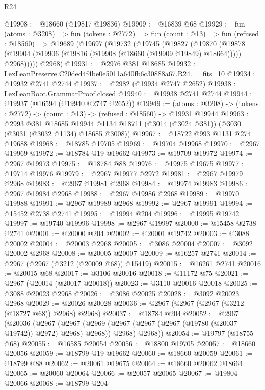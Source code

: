 \begin{lexlean}{R24}
\begin{coremodule}
@19908 := @18660 (@19817 @19836)
@19909 := @16839 @68
@19929 := fun (atoms : @3208) =>
  fun (tokens : @2772) =>
  fun (count : @13) =>
  fun (refused : @18560) =>
  @19689
    (@19697
      (@19732
        (@19745
          (@19827
            (@19870
              (@19878 (@19904 (@19906 (@19816 (@19908 (@18660 (@19909 @19849) @18664))))) @2968)))))
      @2968)
@19931 := @2976 @381 @18685
@19932 := LexLeanPreserve.C20ded4f4be0e5011a640fb6c30888a67.R24.__fits_10
@19934 := @19932 @2741 @2744
@19937 := @2982 (@19934 @2747 @2652)
@19938 := LexLeanBoot.GrammarProof.closed
@19940 := @19938 @2741 @2744
@19944 := @19937 (@16594 (@19940 @2747 @2652))
@19949 := (atoms : @3208) ->
  (tokens : @2772) -> (count : @13) -> (refused : @18560) -> @19931 @19944
@19963 := @2993
    @381
    @18685
    @19944
    @1134
    @18711
    (@3014 (@3024 @381))
    (@3030 (@3031 (@3032 @1134) @18685 @3008))
@19967 := @18722 @993 @1131 @274 @19688
@19968 := @18785 @19705
@19969 := @19704 @19968
@19970 := @2967 @19969
@19972 := @18784 @19 @19662
@19973 := @19709 @19972
@19974 := @2967 @19973
@19975 := @18784 @88
@19976 := @19975 @19675
@19977 := @19714 @19976
@19979 := @2967 @19977 @2972
@19981 := @2967 @19979 @2968
@19983 := @2967 @19981 @2968
@19984 := @19974 @19983
@19986 := @2967 @19984 @2968
@19988 := @2967 @19986 @2968
@19989 := @19970 @19988
@19991 := @2967 @19989 @2968
@19992 := @2967 @19991
@19994 := @15452 @2738 @2741
@19995 := @19994 @204
@19996 := @19995 @19742
@19997 := @19740 @19996
@19998 := @2967 @19997
@20000 := @15458 @2738 @2741
@20001 := @20000 @204
@20002 := @20001 @19742
@20003 := @3088 @20002
@20004 := @20003 @2968
@20005 := @3086 @20004
@20007 := @3092 @20002 @2968
@20008 := @20005 @20007
@20009 := @16257 @2741
@20014 := @2967 (@2967 (@3212 (@20009 @68)) @15419)
@20015 := @16261 @2741
@20016 := @20015 @68
@20017 := @3106 @20016
@20018 := @11172 @75
@20021 := @2967 (@20014 (@20017 @20018))
@20023 := @3110 @20016 @20018
@20025 := @3088 @20023 @2968
@20026 := @3086 @20025
@20028 := @3092 @20023 @2968
@20029 := @20026 @20028
@20036 := @2967 (@2967 (@2967 (@3212 (@18727 @68)) @2968) @2968)
@20037 := @18784 @204
@20052 := @2967
    (@20036
      (@2967
        (@2967 (@2969 (@2967 (@2967 (@2967 (@19780 (@20037 @19742)) @2972) @2968) @2968)) @2968)
        @2968))
@20054 := @19797 (@18755 @68)
@20055 := @16585 @20054
@20056 := @18800 @19705
@20057 := @18660 @20056
@20059 := @18799 @19 @19662
@20060 := @18660 @20059
@20061 := @18799 @88
@20062 := @20061 @19675
@20064 := @18660 @20062 @18664
@20065 := @20060 @20064
@20066 := @20057 @20065
@20067 := @19804 @20066
@20068 := @18799 @204

\end{coremodule}
\end{lexlean}

